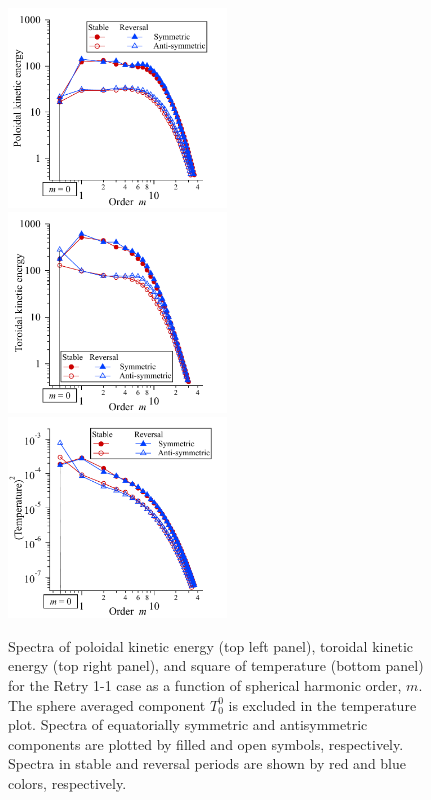 \begin{figure}[tb]
\hfill
\includegraphics*[width=58mm]{Figures/Kpol_spectr_m.pdf} %
\hfill
\includegraphics*[width=58mm]{Figures/Ktor_spectr_m.pdf} \hfill \\
\includegraphics*[width=58mm]{Figures/Temp_spectr_m.pdf}
\caption{
Spectra of poloidal kinetic energy (top left panel), toroidal kinetic energy (top right panel), and square of temperature (bottom panel) 
for the Retry 1-1 case 
as a function of spherical harmonic order, $m$. 
The sphere averaged component $T_{0}^{0}$ is excluded in the temperature plot.
Spectra of equatorially symmetric and antisymmetric components are plotted by filled and open symbols, respectively.
Spectra in stable and reversal periods are shown by red and blue colors, respectively.
}
\label{fig:KE_temp_spectra_m}
\end{figure}